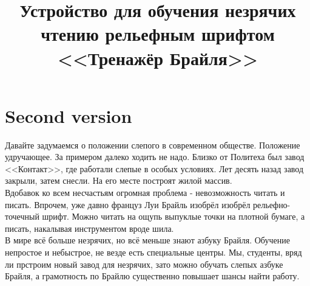 \documentclass[a4paper,12pt]{article} %
\begin{document}
\title{Устройство для обучения незрячих чтению рельефным шрифтом <<Тренажёр Брайля>>}
\maketitle
\section{Second version}
Давайте задумаемся о положении слепого в современном обществе. Положение удручающее. За примером далеко ходить не надо. Близко от Политеха был завод <<Контакт>>, где работали слепые в особых условиях. Лет десять назад завод закрыли, затем снесли. На его месте построят жилой массив.\\
Вдобавок ко всем несчастьям огромная проблема - невозможность читать и писать. Впрочем, уже давно француз Луи Брайль изобрёл изобрёл рельефно-точечный шрифт. Можно читать на ощупь выпуклые точки на плотной бумаге, а писать, накалывая инструментом вроде шила.\\
В мире всё больше незрячих, но всё меньше знают азбуку Брайля. Обучение непростое и небыстрое, не везде есть специальные центры. Мы, студенты, вряд ли прстроим новый завод для незрячих, зато можно обучать слепых азбуке Брайля, а грамотность по Брайлю существенно повышает шансы найти работу.\\
\end{document}
